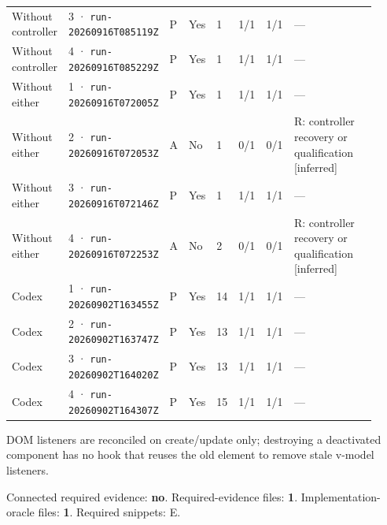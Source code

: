 \begin{landscape}
\begin{longtable}{@{}L{0.11\linewidth}L{0.16\linewidth}*{1}{L{0.022\linewidth}}L{0.05\linewidth}L{0.045\linewidth}L{0.08\linewidth}L{0.085\linewidth}L{0.368\linewidth}@{}}
Without controller & 3 · \texttt{run-20260916\allowbreak T085119Z} & P & Yes & 1 & 1/1 & 1/1 & --- \\
Without controller & 4 · \texttt{run-20260916\allowbreak T085229Z} & P & Yes & 1 & 1/1 & 1/1 & --- \\
Without either & 1 · \texttt{run-20260916\allowbreak T072005Z} & P & Yes & 1 & 1/1 & 1/1 & --- \\
Without either & 2 · \texttt{run-20260916\allowbreak T072053Z} & A & No & 1 & 0/1 & 0/1 & R: controller recovery or qualification [inferred] \\
Without either & 3 · \texttt{run-20260916\allowbreak T072146Z} & P & Yes & 1 & 1/1 & 1/1 & --- \\
Without either & 4 · \texttt{run-20260916\allowbreak T072253Z} & A & No & 2 & 0/1 & 0/1 & R: controller recovery or qualification [inferred] \\
Codex & 1 · \texttt{run-20260902\allowbreak T163455Z} & P & Yes & 14 & 1/1 & 1/1 & --- \\
Codex & 2 · \texttt{run-20260902\allowbreak T163747Z} & P & Yes & 13 & 1/1 & 1/1 & --- \\
Codex & 3 · \texttt{run-20260902\allowbreak T164020Z} & P & Yes & 13 & 1/1 & 1/1 & --- \\
Codex & 4 · \texttt{run-20260902\allowbreak T164307Z} & P & Yes & 15 & 1/1 & 1/1 & --- \\
\end{longtable}
\endgroup
\end{landscape}

\label{sec:vuejs-vue-10004}

DOM listeners are reconciled on create/update only; destroying a deactivated component has no hook that reuses the old element to remove stale v-model listeners.

Connected required evidence: \textbf{no}. Required-evidence files: \textbf{1}. Implementation-oracle files: \textbf{1}. Required snippets: E.


